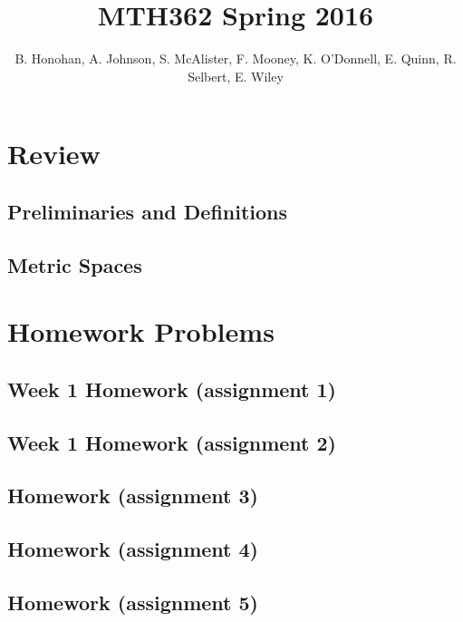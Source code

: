 \documentclass[12pt]{amsbook}
\theoremstyle{plain}
\numberwithin{section}{chapter}
\begin{document}
\title{MTH362 Spring 2016}
\maketitle
\author{B. Honohan, A. Johnson, S. McAlister, F. Mooney, K. O'Donnell, E. Quinn, R. Selbert, E. Wiley}
\setcounter{tocdepth}{4} 
\tableofcontents
\mainmatter 
\chapter{Review}
\section{Preliminaries and Definitions}


\section{Metric Spaces}



\chapter{Homework Problems}
\section{Week 1 Homework (assignment 1)}

\section{Week 1 Homework (assignment 2)}

\section{Homework (assignment 3)}

\section{Homework (assignment 4)}

\section{Homework (assignment 5)}

\end{document}
